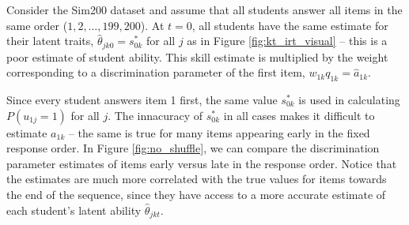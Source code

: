 Consider the Sim200 dataset and assume that all students answer all items in the same order ($1, 2, \ldots,199,200$). At $t=0$, all students have the same estimate for their latent traits, $\hat{\theta}_{jk0} = s_{0k}^*$ for all $j$ as in Figure \ref{fig:kt_irt_visual} -- this is a poor estimate of student ability. This skill estimate is multiplied by the weight corresponding to a discrimination parameter of the first item, $w_{1k}q_{1k} = \hat a_{1k}$. 

Since every student answers item 1 first, the same value $s_{0k}^*$ is used in calculating $P(u_{1j} = 1)$ for all $j$. The innacuracy of $s_{0k}^*$ in all cases makes it difficult to estimate $a_{1k}$ -- the same is true for many items appearing early in the fixed response order. In Figure \ref{fig:no_shuffle}, we can compare the discrimination parameter estimates of items early versus late in the response order. Notice that the estimates are much more correlated with the true values for items towards the end of the sequence, since they have access to a more accurate estimate of each student's latent ability $\hat \theta_{jkt}$.

